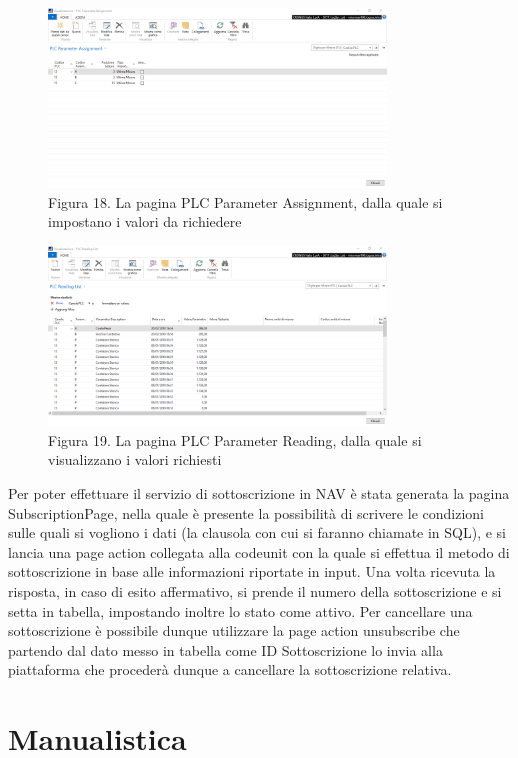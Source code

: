 \begin{figure}[ht]
	\centering
	\includegraphics[width=0.8\textwidth]{PLC-Assigment-List.png}
	\caption*{Figura 18. La pagina PLC Parameter Assignment, dalla quale si impostano i valori da richiedere}
\end{figure}
\clearpage
\begin{figure}[h]
	\centering
	\includegraphics[width=0.8\textwidth]{PLC-Reading-List.png}
	\caption*{Figura 19. La pagina PLC Parameter Reading, dalla quale si visualizzano i valori richiesti}
\end{figure}
Per poter effettuare il servizio di sottoscrizione in NAV è stata generata la pagina SubscriptionPage, nella quale è presente la possibilità di scrivere le condizioni sulle quali si vogliono i dati (la clausola con cui si faranno chiamate in SQL), e si lancia una page action collegata alla codeunit con la quale si effettua il metodo di sottoscrizione in base alle informazioni riportate in input. Una volta ricevuta la risposta, in caso di esito affermativo, si prende il numero della sottoscrizione e si setta in tabella, impostando inoltre lo stato come attivo. Per cancellare una sottoscrizione è possibile dunque utilizzare la page action unsubscribe che partendo dal dato messo in tabella come ID Sottoscrizione lo invia alla piattaforma che procederà dunque a cancellare la sottoscrizione relativa. 
\clearpage
\section{Manualistica}

